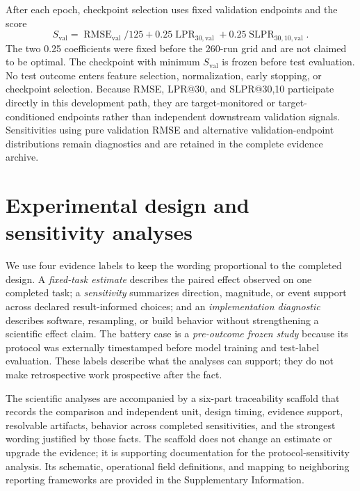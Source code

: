 \documentclass[preprint,12pt,numbers,sort&compress]{elsarticle}
\begin{document}
After each epoch, checkpoint selection uses fixed validation endpoints and the score
\begin{equation}
S_{\mathrm{val}}=\operatorname{RMSE}_{\mathrm{val}}/125+0.25\operatorname{LPR}_{30,\mathrm{val}}+0.25\operatorname{SLPR}_{30,10,\mathrm{val}}.
\label{eq:checkpoint}
\end{equation}
The two 0.25 coefficients were fixed before the 260-run grid and are not claimed to be optimal. The checkpoint with minimum $S_{\mathrm{val}}$ is frozen before test evaluation. No test outcome enters feature selection, normalization, early stopping, or checkpoint selection. Because RMSE, LPR@30, and SLPR@30,10 participate directly in this development path, they are target-monitored or target-conditioned endpoints rather than independent downstream validation signals. Sensitivities using pure validation RMSE and alternative validation-endpoint distributions remain diagnostics and are retained in the complete evidence archive.

\section{Experimental design and sensitivity analyses}

We use four evidence labels to keep the wording proportional to the completed design. A \emph{fixed-task estimate} describes the paired effect observed on one completed task; a \emph{sensitivity} summarizes direction, magnitude, or event support across declared result-informed choices; and an \emph{implementation diagnostic} describes software, resampling, or build behavior without strengthening a scientific effect claim. The battery case is a \emph{pre-outcome frozen study} because its protocol was externally timestamped before model training and test-label evaluation. These labels describe what the analyses can support; they do not make retrospective work prospective after the fact.

The scientific analyses are accompanied by a six-part traceability scaffold that records the comparison and independent unit, design timing, evidence support, resolvable artifacts, behavior across completed sensitivities, and the strongest wording justified by those facts. The scaffold does not change an estimate or upgrade the evidence; it is supporting documentation for the protocol-sensitivity analysis. Its schematic, operational field definitions, and mapping to neighboring reporting frameworks are provided in the Supplementary Information.
\end{document}
